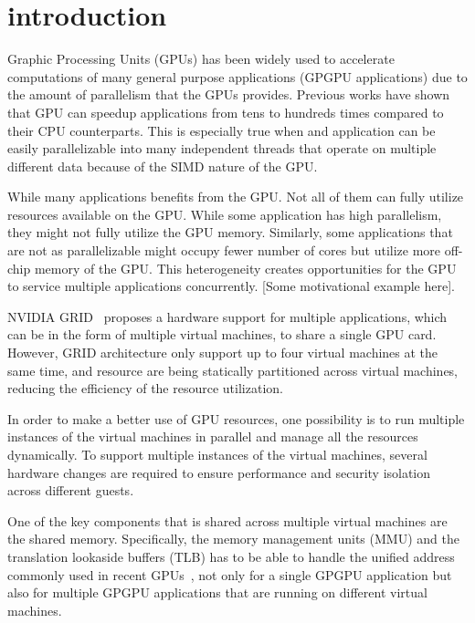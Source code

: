 \section{introduction}

Graphic Processing Units (GPUs) has been widely used to accelerate computations
of many general purpose applications (GPGPU applications) due to the amount of
parallelism that the GPUs provides. Previous works have shown that GPU can
speedup applications from tens to hundreds times compared to their CPU
counterparts. This is especially true when and application can be easily
parallelizable into many independent threads that operate on multiple different
data because of the SIMD nature of the GPU.

While many applications benefits from the GPU. Not all of them can fully utilize
resources available on the GPU. While some application has high parallelism, they
might not fully utilize the GPU memory. Similarly, some applications that are not
as parallelizable might occupy fewer number of cores but utilize more off-chip memory
of the GPU. This heterogeneity creates opportunities for the GPU to service multiple
applications concurrently. [Some motivational example here].

NVIDIA GRID~\cite{grid} proposes a hardware support for multiple applications, which
can be in the form of multiple virtual machines, to share a single GPU card. However,
GRID architecture only support up to four virtual machines at the same time, and resource
are being statically partitioned across virtual machines, reducing the efficiency of
the resource utilization.

In order to make a better use of GPU resources, one possibility is to run
multiple instances of the virtual machines in parallel and manage all the
resources dynamically. To support multiple instances of the virtual machines,
several hardware changes are required to ensure performance and security
isolation across different guests.

One of the key components that is shared across multiple virtual machines are
the shared memory. Specifically, the memory management units (MMU) and the
translation lookaside buffers (TLB) has to be able to handle the unified address
commonly used in recent GPUs~\cite{kepler, fermi}, not only for a single GPGPU application
but also for multiple GPGPU applications that are running on different virtual machines.

